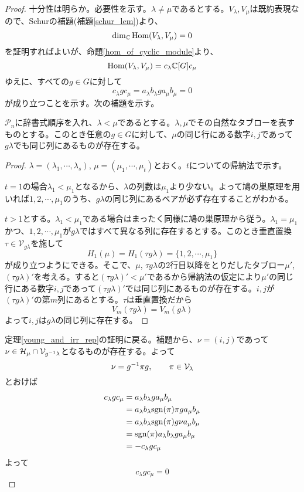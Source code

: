 \documentclass{ltjsreport}
\begin{document}
\begin{proof}
  十分性は明らか。必要性を示す。$\lambda\neq\mu$であるとする。$V_\lambda, V_\mu$は既約表現なので、Schurの補題(補題\ref{schur_lem})より、
  \[
  \dim_{\mathbb{C}}\text{Hom}(V_\lambda,V_\mu)=0  
  \]
  を証明すればよいが、命題\ref{hom_of_cyclic_module}より、
  \[
  \text{Hom}(V_\lambda,V_\mu)=c_\lambda\mathbb{C}[G]c_\mu
  \]
  ゆえに、すべての$g\in G$に対して
  \[
  c_\lambda gc_\mu  =a_\lambda b_\lambda g a_\mu b_\mu = 0
  \]
  が成り立つことを示す。次の補題を示す。
  \begin{lemm}
    $\mathcal{P}_n$に辞書式順序を入れ、$\lambda < \mu$であるとする。$\lambda, \mu$でその自然なタブローを表すものとする。このとき任意の$g\in G$に対して、$\mu$の同じ行にある数字$i,j$であって$g\lambda$でも同じ列にあるものが存在する。
  \end{lemm}

  \begin{proof}
    $\lambda=(\lambda_1,\cdots,\lambda_s)$, $\mu=(\mu_1,\cdots,\mu_t)$とおく。$t$についての帰納法で示す。

    $t=1$の場合$\lambda_1<\mu_1$となるから、$\lambda$の列数は$\mu_1$より少ない。よって鳩の巣原理を用いれば$1,2,\cdots,\mu_1$のうち、$g\lambda$の同じ列にあるペアが必ず存在することがわかる。

    $t>1$とする。$\lambda_1<\mu_1$である場合はまったく同様に鳩の巣原理から従う。$\lambda_1=\mu_1$かつ、$1,2,\cdots,\mu_1$が$g\lambda$ではすべて異なる列に存在するとする。このとき垂直置換$\tau\in\mathcal{V}_{g\lambda}$を施して
    \[
    H_1(\mu)=H_1(\tau g\lambda)=\{1,2,\cdots,\mu_1\}  
    \]
    が成り立つようにできる。そこで、$\mu$, $\tau g\lambda$の2行目以降をとりだしたタブロー$\mu'$, $(\tau g\lambda)'$を考える。すると$(\tau g\lambda)'<\mu'$であるから帰納法の仮定により$\mu'$の同じ行にある数字$i,j$であって$(\tau g\lambda)'$では同じ列にあるものが存在する。$i,j$が$(\tau g\lambda)'$の第$m$列にあるとする。$\tau$は垂直置換だから
    \[
    V_m(\tau g\lambda)=V_m(g\lambda)
    \]
    よって$i,j$は$g\lambda$の同じ列に存在する。
  \end{proof}

  定理\ref{young_and_irr_rep}の証明に戻る。補題から、$\nu=(i,j)$であって$\nu\in \mathcal{H}_\mu\cap\mathcal{V}_{g^{-1}\lambda}$となるものが存在する。よって
  \[
  \nu=g^{-1}\pi g,\qquad \pi\in \mathcal{V}_{\lambda}
  \]
  とおけば
  \begin{align*}
    c_\lambda g c_\mu
    &=a_\lambda b_\lambda g a_\mu b_\mu\\
    &=a_\lambda b_\lambda \mathrm{sgn}(\pi)\pi g a_\mu b_\mu\\
    &=a_\lambda b_\lambda \mathrm{sgn}(\pi)g\nu a_\mu b_\mu\\
    &=\mathrm{sgn}(\pi)a_\lambda b_\lambda g a_\mu b_\mu\\
    &=-c_\lambda g c_\mu
  \end{align*}
  よって
  \[
    c_\lambda g c_\mu=0
  \]
\end{proof}
\end{document}
